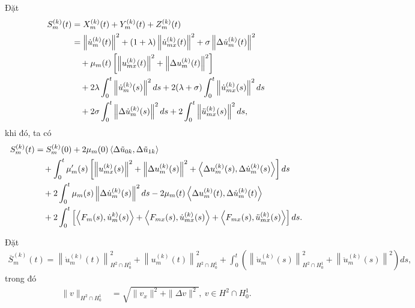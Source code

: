 \documentclass[12pt,a4paper]{article}
\theoremstyle{definition}
\theoremstyle{definition}
\begin{document}
Đặt
\begin{align}
    S_m^{(k)}(t)
    &= X_m^{(k)}(t) + Y_m^{(k)}(t) + Z_m^{(k)}(t) \\
    &= \left\|\dot{u}_m^{(k)}(t)\right\|^2
      + (1 + \lambda) \left\|\dot{u}_{mx}^{(k)}(t)\right\|^2
      + \sigma \left\|\Delta \dot{u}_m^{(k)}(t)\right\|^2 \notag \\
    &\quad + \mu_m(t) \left[\left\|u_{mx}^{(k)}(t)\right\|^2 + \left\|\Delta u_m^{(k)}(t)\right\|^2\right] \notag \\
    &\quad + 2\lambda \int_0^t \left\|\dot{u}_m^{(k)}(s)\right\|^2 ds + 2(\lambda + \sigma) \int_0^t \left\|\dot{u}_{mx}^{(k)}(s)\right\|^2 ds \notag \\
    &\quad +2 \sigma \int_0^t \left\|\Delta \dot{u}_m^{(k)}(s)\right\|^2 ds + 2 \int_0^t \left\|\ddot{u}_{mx}^{(k)}(s)\right\|^2 ds, \notag
\end{align}
khi đó, ta có
\begin{align}
    S_m^{(k)}(t)
    &= S_m^{(k)}(0) + 2 \mu_m(0) \left< \Delta \tilde{u}_{0k}, \Delta \tilde{u}_{1k} \right> \\
    &\quad + \int_0^t \mu'_m(s) \left[\left\|u_{mx}^{(k)}(s)\right\|^2 + \left\|\Delta u_m^{(k)}(s)\right\|^2 + \left<\Delta u_m^{(k)}(s), \Delta \dot{u}_m^{(k)}(s)\right>\right] ds \notag \\
    &\quad + 2 \int_0^t \mu_m(s) \left\|\Delta \dot{u}_m^{(k)}(s)\right\|^2 ds - 2 \mu_m(t) \left<\Delta u_m^{(k)}(t), \Delta \dot{u}_m^{(k)}(t)\right> \notag \\
    &\quad + 2 \int_0^t \left[\left<F_m(s), \dot{u}_m^{k)}(s)\right> + \left< F_{mx}(s), \dot{u}_{mx}^{(k)}(s)\right> + \left<F_{mx}(s), \ddot{u}_{mx}^{(k)}(s)\right>\right] ds. \notag
\end{align}

Đặt
\begin{align*}
    \overline{S}_m^{(k)}(t)
    = \left\|\dot{u}_m^{(k)}(t)\right\|^2_{H^2 \cap H^1_0} + \left\|u_m^{(k)}(t)\right\|^2_{H^2 \cap H^1_0} + \int_0^t \left(\left\|\dot{u}_m^{(k)}(s)\right\|^2_{H^2 \cap H^1_0} + \left\|\ddot{u}_m^{(k)}(s)\right\|^2\right) ds,
\end{align*}
trong đó
\begin{align*}
    \|v\|_{H^2 \cap H^1_0} &= \sqrt{\|v_x\|^2 + \|\Delta v\|^2},\ v \in H^2 \cap H^1_0.
\end{align*}
\end{document}
